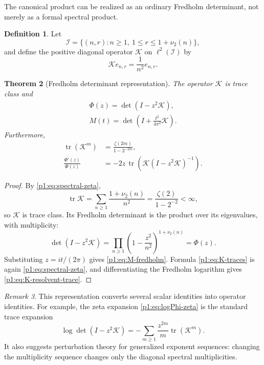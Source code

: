 \documentclass[11pt]{article}
\newtheorem{theorem}{Theorem}[section]
\theoremstyle{definition}
\newtheorem{definition}[theorem]{Definition}
\theoremstyle{remark}
\newtheorem{remark}[theorem]{Remark}
\newcommand{\tr}{\operatorname{tr}}
\newcommand{\cK}{\mathcal K}
\begin{document}
The canonical product can be realized as an ordinary Fredholm determinant, not merely as a
formal spectral product.

\begin{definition}
Let
\begin{equation}
 \mathcal I=\{(n,r):n\ge1,\ 1\le r\le 1+\nu_2(n)\},
\end{equation}
and define the positive diagonal operator \(\cK\) on \(\ell^2(\mathcal I)\) by
\begin{equation}
 \cK e_{n,r}=\frac1{n^2}e_{n,r}.                             \label{p1:eq:K-def}
\end{equation}
\end{definition}

\begin{theorem}[Fredholm determinant representation]\label{p1:thm:fredholm}
The operator \(\cK\) is trace class and
\begin{align}
 \boxed{\Phi(z)=\det(I-z^2\cK)},                             \label{p1:eq:Phi-fredholm}\\
 \boxed{M(t)=\det\!\left(I+\frac{t^2}{4\pi^2}\cK\right)}.  \label{p1:eq:M-fredholm}
\end{align}
Furthermore,
\begin{align}
 \tr(\cK^m)&=\frac{\zeta(2m)}{1-2^{-2m}},                   \label{p1:eq:K-traces}\\
 \frac{\Phi'(z)}{\Phi(z)}
 &=-2z\,\tr\!\left(\cK(I-z^2\cK)^{-1}\right).            \label{p1:eq:K-resolvent-trace}
\end{align}
\end{theorem}

\begin{proof}
By \eqref{p1:eq:spectral-zeta},
\[
 \tr\cK=\sum_{n\ge1}\frac{1+\nu_2(n)}{n^2}
 =\frac{\zeta(2)}{1-2^{-2}}<\infty,
\]
so \(\cK\) is trace class.  Its Fredholm determinant is the product over its eigenvalues,
with multiplicity:
\[
 \det(I-z^2\cK)
 =\prod_{n\ge1}\left(1-\frac{z^2}{n^2}\right)^{1+\nu_2(n)}
 =\Phi(z).
\]
Substituting \(z=it/(2\pi)\) gives \eqref{p1:eq:M-fredholm}.  Formula
\eqref{p1:eq:K-traces} is again \eqref{p1:eq:spectral-zeta}, and differentiating the Fredholm
logarithm gives \eqref{p1:eq:K-resolvent-trace}.
\end{proof}

\begin{remark}
This representation converts several scalar identities into operator identities.  For
example, the zeta expansion \eqref{p1:eq:logPhi-zeta} is the standard trace expansion
\[
 \log\det(I-z^2\cK)=-\sum_{m\ge1}\frac{z^{2m}}m\tr(\cK^m).
\]
It also suggests perturbation theory for generalized exponent sequences: changing the
multiplicity sequence changes only the diagonal spectral multiplicities.
\end{remark}
\end{document}
